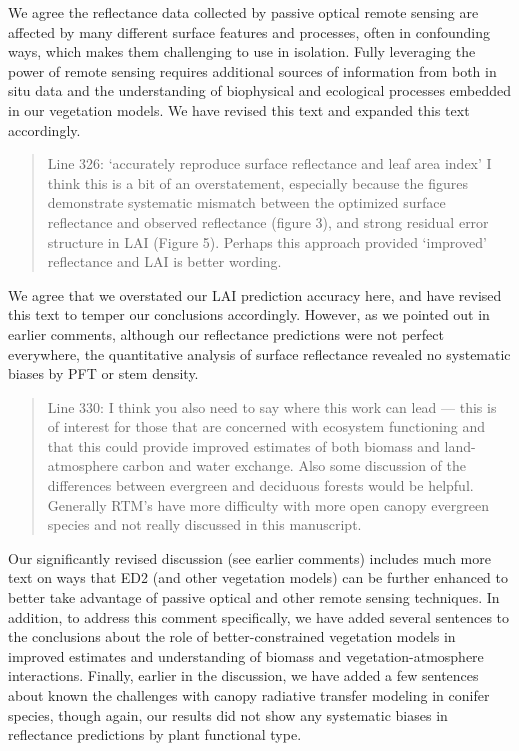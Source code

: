 We agree the reflectance data collected by passive optical remote sensing are affected by many different surface features and processes, often in confounding ways, which makes them challenging to use in isolation. Fully leveraging the power of remote sensing requires additional sources of information from both in situ data and the understanding of biophysical and ecological processes embedded in our vegetation models. We have revised this text and expanded this text accordingly.

\begin{quote}
  Line 326: ‘accurately reproduce surface reflectance and leaf area index’ I think this is a bit of an overstatement, especially because the figures demonstrate systematic mismatch between the optimized surface reflectance and observed reflectance (figure 3), and strong residual error structure in LAI (Figure 5). Perhaps this approach provided ‘improved’ reflectance and LAI is better wording.
\end{quote}

We agree that we overstated our LAI prediction accuracy here, and have revised this text to temper our conclusions accordingly. However, as we pointed out in earlier comments, although our reflectance predictions were not perfect everywhere, the quantitative analysis of surface reflectance revealed no systematic biases by PFT or stem density.

\begin{quote}
  Line 330: I think you also need to say where this work can lead — this is of interest for those that are concerned with ecosystem functioning and that this could provide improved estimates of both biomass and land-atmosphere carbon and water exchange. Also some discussion of the differences between evergreen and deciduous forests would be helpful. Generally RTM’s have more difficulty with more open canopy evergreen species and not really discussed in this manuscript.
\end{quote}

Our significantly revised discussion (see earlier comments) includes much more text on ways that ED2 (and other vegetation models) can be further enhanced to better take advantage of passive optical and other remote sensing techniques. In addition, to address this comment specifically, we have added several sentences to the conclusions about the role of better-constrained vegetation models in improved estimates and understanding of biomass and vegetation-atmosphere interactions. Finally, earlier in the discussion, we have added a few sentences about known the challenges with canopy radiative transfer modeling in conifer species, though again, our results did not show any systematic biases in reflectance predictions by plant functional type.

